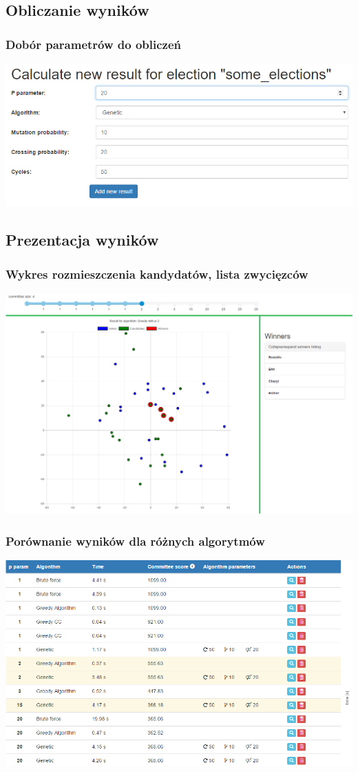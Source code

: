 \documentclass{beamer}
\begin{document}
\subsection{Obliczanie wyników}
\begin{frame}
\frametitle{Dobór parametrów do obliczeń}
\includegraphics[width=0.9\paperwidth]{pics/parameters.png}
\end{frame}

\subsection{Prezentacja wyników}
\begin{frame}
\frametitle{Wykres rozmieszczenia kandydatów, lista zwycięzców}
\includegraphics[width=0.80\paperwidth]{pics/chart_with_slider_and_winners.png}
\end{frame}

\begin{frame}
\frametitle{Porównanie wyników dla różnych algorytmów}
\includegraphics[width=0.85\paperwidth]{pics/algorithms_comparison_table.png}
\end{frame}
\end{document}
